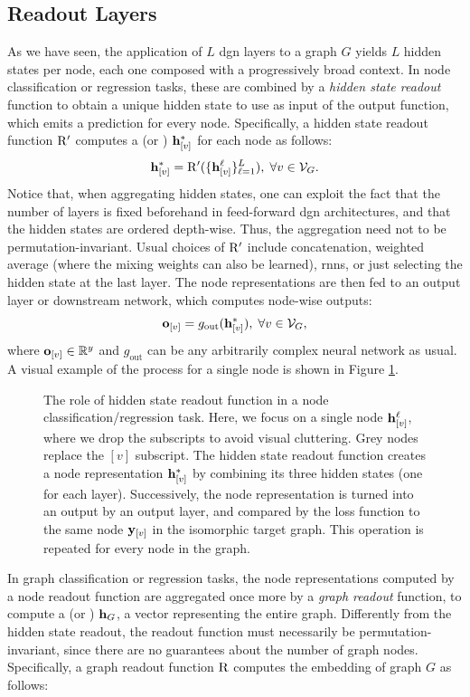 \subsection{Readout Layers} 
As we have seen, the application of $L$ \gls{dgn} layers to a graph $G$ yields $L$ hidden states per node, each one composed with a progressively broad context. In node classification or regression tasks, these are combined by a \emph{hidden state readout} function to obtain a unique hidden state to use as input of the output function, which emits a prediction for every node. Specifically, a hidden state readout function $\mathrm{R'}$ computes a  (or ) $\Elem{h}{v}^*$ for each node as follows:
$$\Elem{h}{v}^* = \Fun{R'}(\Set{\Elem{h}{v}^{\ell}}_{\ell=1}^L),\;  \forall v \in \Cal{v}_G. $$
Notice that, when aggregating hidden states, one can exploit the fact that the number of layers is fixed beforehand in feed-forward \gls{dgn} architectures, and that the hidden states are ordered depth-wise. Thus, the aggregation need not to be permutation-invariant. Usual choices of $\mathrm{R'}$ include concatenation, weighted average (where the mixing weights can also be learned), \gls{rnn}s, or just selecting the hidden state at the last layer. The node representations are then fed to an output layer or downstream network, which computes node-wise outputs:
$$\Elem{o}{v} = g_{\mathrm{out}}(\Elem{h}{v}^*),\; \forall v \in \Cal{v}_G,$$
where $\Elem{o}{v} \in \Real^y$ and $g_{\mathrm{out}}$ can be any arbitrarily complex neural network as usual. A visual example of the process for a single node is shown in Figure \ref{fig:node-readout}.
\begin{figure}[h!]
    \centering
    \resizebox{.6\textwidth}{!}{}
    \caption{The role of hidden state readout function in a node classification/regression task. Here, we focus on a single node $\Elem{h}{v}^{\ell}$, where we drop the subscripts to avoid visual cluttering. Grey nodes replace the $[v]$ subscript. The hidden state readout function creates a node representation $\Elem{h}{v}^{*}$ by combining its three hidden states (one for each layer). Successively, the node representation is turned into an output by an output layer, and compared by the loss function to the same node $\Elem{y}{v}$ in the isomorphic target graph. This operation is repeated for every node in the graph.}
    \label{fig:node-readout}
\end{figure}
In graph classification or regression tasks, the node representations computed by a node readout function are aggregated once more by a \emph{graph readout} function, to compute a  (or ) $\Vector{h}_G$, \ie a vector representing the entire graph. Differently from the hidden state readout, the readout function must necessarily be permutation-invariant, since there are no guarantees about the number of graph nodes. Specifically, a graph readout function $\mathrm{R}$ computes the embedding of graph $G$ as follows:
